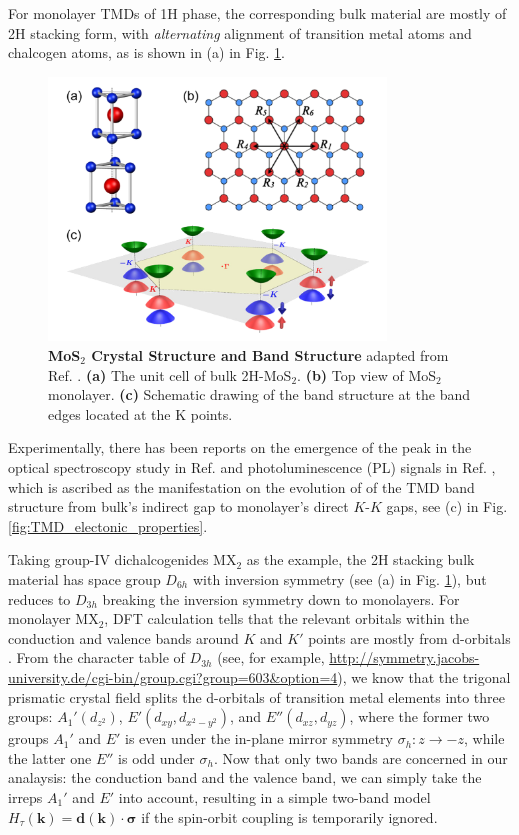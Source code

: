 For monolayer TMDs of 1H phase, the corresponding bulk material are mostly of 2H stacking form, with \emph{alternating} alignment of transition metal atoms and chalcogen atoms, as is shown in (a) in Fig. \ref{fig:MoS2_Di}.
\begin{figure}[!htp]
    \centering
    \includegraphics[width=0.8\textwidth]{figures/Background/MoS2_Di.png}
    \caption{\textbf{MoS$_2$ Crystal Structure and Band Structure} adapted from Ref. \cite{xiao2012coupled}. \textbf{(a)} The unit cell of bulk 2H-MoS$_2$. \textbf{(b)} Top view of MoS$_2$ monolayer. \textbf{(c)} Schematic drawing of the band structure at the band edges located at the K points.}
    \label{fig:MoS2_Di}
\end{figure}
Experimentally, there has been reports on the emergence of the peak in the optical spectroscopy study in Ref. \cite{mak2010atomically} and photoluminescence (PL) signals in Ref. \cite{splendiani2010emerging}, which is ascribed as the manifestation on the evolution of of the TMD band structure from bulk's indirect gap to monolayer's direct $K$-$K$ gaps, see (c) in Fig. \ref{fig:TMD_electonic_properties}.

Taking group-IV dichalcogenides MX$_2$ as the example, the 2H stacking bulk material has space group $D_{6h}$ with inversion symmetry (see (a) in Fig. \ref{fig:MoS2_Di}), but reduces to $D_{3h}$ breaking the inversion symmetry down to monolayers. For monolayer MX$_2$, DFT calculation tells that the relevant orbitals within the conduction and valence bands around $K$ and $K'$ points are mostly from d-orbitals \cite{mattheiss1973band}. From the character table of $D_{3h}$ (see, for example, \url{http://symmetry.jacobs-university.de/cgi-bin/group.cgi?group=603&option=4}), we know that the trigonal prismatic crystal field splits the d-orbitals of transition metal elements into three groups: $A_1'(d_{z^2})$, $E'(d_{xy}, d_{x^2-y^2})$, and $E''(d_{xz}, d_{yz})$, where the former two groups $A_1'$ and $E'$ is even under the in-plane mirror symmetry $\sigma_h: z\rightarrow-z$, while the latter one $E''$ is odd under $\sigma_h$. Now that only two bands are concerned in our analaysis: the conduction band and the valence band, we can simply take the irreps $A_1'$ and $E'$ into account, resulting in a simple two-band model $H_\tau(\bm k)=\bm d(\bm k)\cdot\bm\sigma$ if the spin-orbit coupling is temporarily ignored.


